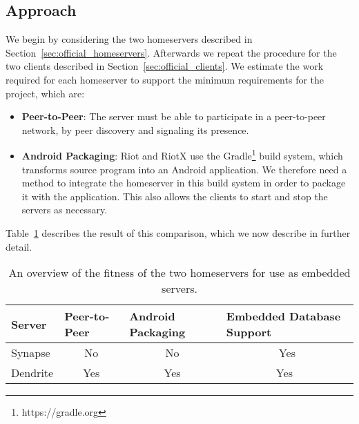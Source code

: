 \subsection{Approach}
We begin by considering the two homeservers described in Section~\ref{sec:official_homeservers}.
Afterwards we repeat the procedure for the two clients described in Section~\ref{sec:official_clients}.
We estimate the work required for each homeserver to support the minimum requirements for the project, which are:
\begin{itemize}
	\item{
	      \textbf{Peer-to-Peer}:
	      The server must be able to participate in a peer-to-peer network, by peer discovery and signaling its presence.
	      }
	\item{
	      \textbf{Android Packaging}:
	      Riot and RiotX use the Gradle\footnote{https://gradle.org} build system, which transforms source program into an Android application.
	      We therefore need a method to integrate the homeserver in this build system in order to package it with the application.
	      This also allows the clients to start and stop the servers as necessary.
	      }
\end{itemize}

Table~\ref{tab:homeserver_comparison} describes the result of this comparison, which we now describe in further detail.

\begin{table}
	\center{}
	\begin{tabular}{lccc}
		\textbf{Server} & \multicolumn{1}{l}{\textbf{Peer-to-Peer}} & \multicolumn{1}{l}{\textbf{Android Packaging}} & \multicolumn{1}{l}{\textbf{Embedded Database Support}} \\ \toprule
		Synapse         & No                                        & No                                             & Yes                                                    \\
		Dendrite        & Yes                                       & Yes                                            & Yes\footnotemark\
	\end{tabular}
	\caption{An overview of the fitness of the two homeservers for use as embedded servers.}%
	\label{tab:homeserver_comparison}
\end{table}

